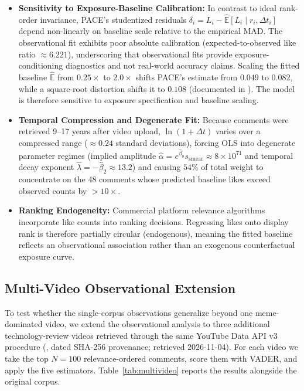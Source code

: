 \documentclass[journal]{IEEEtran}
\begin{document}
\begin{itemize}
    \item \textbf{Sensitivity to Exposure-Baseline Calibration:} In contrast to ideal rank-order invariance, PACE's studentized residuals $\delta_i = L_i - \hat{\mathbb{E}}[L_i \mid r_i, \Delta t_i]$ depend non-linearly on baseline scale relative to the empirical MAD. The observational fit exhibits poor absolute calibration (expected-to-observed like ratio $\approx 6.221$), underscoring that observational fits provide exposure-conditioning diagnostics and not real-world accuracy claims. Scaling the fitted baseline $\hat{\mathbb{E}}$ from $0.25\times$ to $2.0\times$ shifts PACE's estimate from $0.049$ to $0.082$, while a square-root distortion shifts it to $0.108$ (documented in ). The model is therefore sensitive to exposure specification and baseline scaling.
    \item \textbf{Temporal Compression and Degenerate Fit:} Because comments were retrieved 9--17 years after video upload, $\ln(1 + \Delta t)$ varies over a compressed range ($\approx 0.24$ standard deviations), forcing OLS into degenerate parameter regimes (implied amplitude $\hat{\alpha} = e^{\hat{\beta}_0} s_{\text{smear}} \approx 8 \times 10^{71}$ and temporal decay exponent $\hat{\lambda} = -\hat{\beta}_2 \approx 13.2$) and causing $54\%$ of total weight to concentrate on the 48 comments whose predicted baseline likes exceed observed counts by $>10\times$.
    \item \textbf{Ranking Endogeneity:} Commercial platform relevance algorithms incorporate like counts into ranking decisions. Regressing likes onto display rank is therefore partially circular (endogenous), meaning the fitted baseline reflects an observational association rather than an exogenous counterfactual exposure curve.
\end{itemize}

\subsection{Multi-Video Observational Extension}
To test whether the single-corpus observations generalize beyond one meme-dominated video, we extend the observational analysis to three additional technology-review videos retrieved through the same YouTube Data API v3 procedure (, dated SHA-256 provenance; retrieved 2026-11-04). For each video we take the top $N = 100$ relevance-ordered comments, score them with VADER, and apply the five estimators. Table~\ref{tab:multivideo} reports the results alongside the original corpus.
\end{document}
